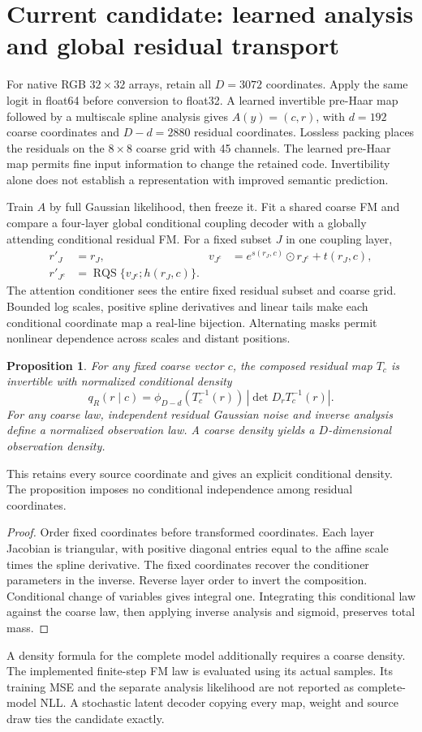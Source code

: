 \documentclass[11pt]{article}
\newtheorem{proposition}{Proposition}
\begin{document}
\clearpage
\section{Current candidate: learned analysis and global residual transport}
For native RGB $32\times32$ arrays, retain all $D=3072$ coordinates. Apply the same logit in float64 before conversion to float32. A learned invertible pre-Haar map followed by a multiscale spline analysis gives $A(y)=(c,r)$, with $d=192$ coarse coordinates and $D-d=2880$ residual coordinates. Lossless packing places the residuals on the $8\times8$ coarse grid with 45 channels. The learned pre-Haar map permits fine input information to change the retained code. Invertibility alone does not establish a representation with improved semantic prediction.

Train $A$ by full Gaussian likelihood, then freeze it. Fit a shared coarse FM and compare a four-layer global conditional coupling decoder with a globally attending conditional residual FM. For a fixed subset $J$ in one coupling layer,
\begin{align}
 r'_J &= r_J, & v_{J^c}&=e^{s(r_J,c)}\odot r_{J^c}+t(r_J,c),\\
 r'_{J^c}&=\operatorname{RQS}\{v_{J^c};h(r_J,c)\}.&&
\end{align}
The attention conditioner sees the entire fixed residual subset and coarse grid. Bounded log scales, positive spline derivatives and linear tails make each conditional coordinate map a real-line bijection. Alternating masks permit nonlinear dependence across scales and distant positions.

\begin{proposition}
For any fixed coarse vector $c$, the composed residual map $T_c$ is invertible with normalized conditional density
\begin{equation}
 q_R(r\mid c)=\phi_{D-d}(T_c^{-1}(r))\,|\det D_rT_c^{-1}(r)|.
\end{equation}
For any coarse law, independent residual Gaussian noise and inverse analysis define a normalized observation law. A coarse density yields a $D$-dimensional observation density.
\end{proposition}
This retains every source coordinate and gives an explicit conditional density. The proposition imposes no conditional independence among residual coordinates.
\begin{proof}
Order fixed coordinates before transformed coordinates. Each layer Jacobian is triangular, with positive diagonal entries equal to the affine scale times the spline derivative. The fixed coordinates recover the conditioner parameters in the inverse. Reverse layer order to invert the composition. Conditional change of variables gives integral one. Integrating this conditional law against the coarse law, then applying inverse analysis and sigmoid, preserves total mass.
\end{proof}
A density formula for the complete model additionally requires a coarse density. The implemented finite-step FM law is evaluated using its actual samples. Its training MSE and the separate analysis likelihood are not reported as complete-model NLL. A stochastic latent decoder copying every map, weight and source draw ties the candidate exactly.
\end{document}
